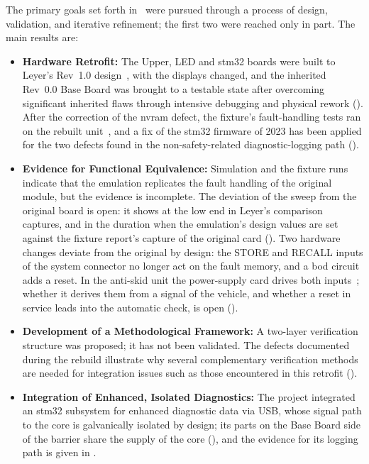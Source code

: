 The primary goals set forth in~ were pursued through a process of design, validation, and iterative refinement; the first two were reached only in part. The main results are:
\begin{itemize}
	\item \textbf{Hardware Retrofit:} The Upper, LED and \gls{stm32} boards were built to Leyer's Rev~1.0 design~\cite{leyer2023}, with the displays changed, and the inherited Rev~0.0 Base Board was brought to a testable state after overcoming significant inherited flaws through intensive debugging and physical rework (). After the correction of the \gls{nvram} defect, the fixture's fault-handling tests ran on the rebuilt unit~\cite[pp.~14--15]{savchuk2025}, and a fix of the \gls{stm32} firmware of 2023 has been applied for the two defects found in the non-safety-related diagnostic-logging path ().
	\item \textbf{Evidence for Functional Equivalence:} Simulation and the fixture runs indicate that the emulation replicates the fault handling of the original module, but the evidence is incomplete. The deviation of the sweep from the original board is open: it shows at the low end in Leyer's comparison captures, and in the duration when the emulation's design values are set against the fixture report's capture of the original card (). Two hardware changes deviate from the original by design: the STORE and RECALL inputs of the system connector no longer act on the fault memory, and a \gls{bod} circuit adds a reset. In the anti-skid unit the power-supply card drives both inputs~\cite{backplane2010}; whether it derives them from a signal of the vehicle, and whether a reset in service leads into the automatic check, is open ().
	\item \textbf{Development of a Methodological Framework:} A two-layer verification structure was proposed; it has not been validated. The defects documented during the rebuild illustrate why several complementary verification methods are needed for integration issues such as those encountered in this retrofit ().
	\item \textbf{Integration of Enhanced, Isolated Diagnostics:} The project integrated an \gls{stm32} subsystem for enhanced diagnostic data via USB, whose signal path to the core is galvanically isolated by design; its parts on the Base Board side of the barrier share the supply of the core (), and the evidence for its logging path is given in .
\end{itemize}

